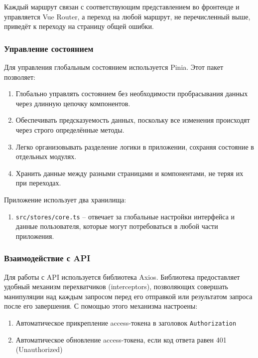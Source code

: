Каждый маршрут связан с соответствующим представлением во фронтенде и управляется Vue Router, а переход на любой маршрут, не перечисленный выше, приведёт к переходу на страницу общей ошибки.

\subsubsection{Управление состоянием}

Для управления глобальным состоянием используется Pinia. Этот пакет позволяет:

\begin{enumerate}
    \item Глобально управлять состоянием без необходимости пробрасывания данных через длинную цепочку компонентов.
    \item Обеспечивать предсказуемость данных, поскольку все изменения происходят через строго определённые методы.
    \item Легко организовывать разделение логики в приложении, сохраняя состояние в отдельных модулях.
    \item Хранить данные между разными страницами и компонентами, не теряя их при переходах.
\end{enumerate}

Приложение использует два хранилища:

\begin{enumerate}
    \item \texttt{src/stores/core.ts} -- отвечает за глобальные настройки интерфейса и данные пользователя, которые могут потребоваться в любой части приложения.
\end{enumerate}

\subsubsection{Взаимодействие с API}

Для работы с API используется библиотека Axios. Библиотека предоставляет удобный механизм перехватчиков (interceptors), позволяющих совершать манипуляции над каждым запросом перед его отправкой или результатом запроса после его завершения. С помощью этого механизма настроены:
\begin{enumerate}
    \item Автоматическое прикрепление access-токена в заголовок \texttt{Authorization}
    \item Автоматическое обновление access-токена, если код ответа равен 401 (Unauthorized)
\end{enumerate}

